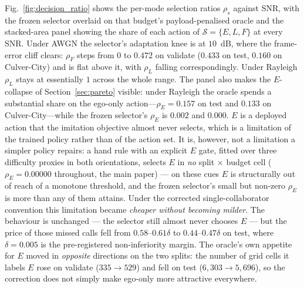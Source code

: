 \documentclass[journal]{IEEEtran}
\begin{document}
Fig.~\ref{fig:decision_ratio} shows the per-mode selection ratios $\rho_s$ against SNR, with the frozen selector overlaid on that budget's payload-penalised oracle and the stacked-area panel showing the share of each action of $\mathcal{S}=\{E,L,F\}$ at every SNR. Under AWGN the selector's adaptation knee is at $10$~dB, where the frame-error cliff clears: $\rho_F$ steps from $0$ to $0.472$ on validate ($0.433$ on test, $0.160$ on Culver-City) and is flat above it, with $\rho_L$ falling correspondingly. Under Rayleigh $\rho_L$ stays at essentially $1$ across the whole range. The panel also makes the $E$-collapse of Section~\ref{sec:pareto} visible: under Rayleigh the oracle spends a substantial share on the ego-only action---$\rho_E=0.157$ on test and $0.133$ on Culver-City---while the frozen selector's $\rho_E$ is $0.002$ and $0.000$. $E$ is a deployed action that the imitation objective almost never selects, which is a limitation of the trained policy rather than of the action set. It is, however, not a limitation a simpler policy repairs: a hand rule with an explicit $E$ gate, fitted over three difficulty proxies in both orientations, selects $E$ in \emph{no} split $\times$ budget cell ($\rho_E=0.00000$ throughout, the main paper) --- on these cues $E$ is structurally out of reach of a monotone threshold, and the frozen selector's small but non-zero $\rho_E$ is more than any of them attains.
Under the corrected single-collaborator convention this limitation became \emph{cheaper without becoming milder}. The behaviour is unchanged --- the selector still almost never chooses $E$ --- but the price of those missed calls fell from $0.58$--$0.61\delta$ to $0.44$--$0.47\delta$ on test, where $\delta=0.005$ is the pre-registered non-inferiority margin. The oracle's own appetite for $E$ moved in \emph{opposite} directions on the two splits: the number of grid cells it labels $E$ rose on validate ($335\to529$) and fell on test ($6{,}303\to5{,}696$), so the correction does not simply make ego-only more attractive everywhere.
\end{document}
